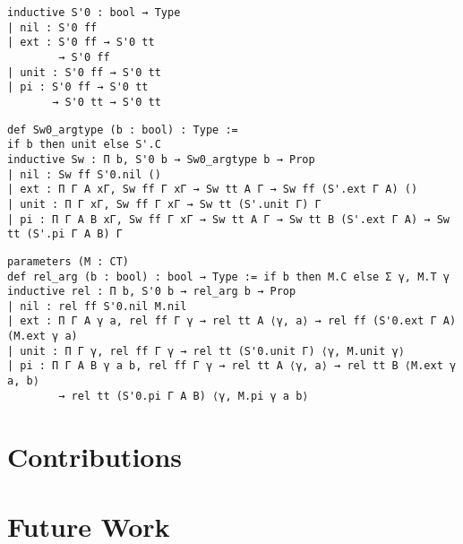 \documentclass{easychair}
\begin{document}
\noindent
\begin{minipage}{.3\textwidth}
\begin{lstlisting}
inductive S'0 : bool → Type
| nil : S'0 ff
| ext : S'0 ff → S'0 tt
        → S'0 ff
| unit : S'0 ff → S'0 tt
| pi : S'0 ff → S'0 tt
       → S'0 tt → S'0 tt
\end{lstlisting}
\end{minipage} \hfill
\begin{minipage}{.68\textwidth}
\begin{lstlisting}
def Sw0_argtype (b : bool) : Type :=
if b then unit else S'.C
inductive Sw : Π b, S'0 b → Sw0_argtype b → Prop
| nil : Sw ff S'0.nil ()
| ext : Π Γ A xΓ, Sw ff Γ xΓ → Sw tt A Γ → Sw ff (S'.ext Γ A) ()
| unit : Π Γ xΓ, Sw ff Γ xΓ → Sw tt (S'.unit Γ) Γ
| pi : Π Γ A B xΓ, Sw ff Γ xΓ → Sw tt A Γ → Sw tt B (S'.ext Γ A) → Sw tt (S'.pi Γ A B) Γ
\end{lstlisting}
\end{minipage}
\noindent\begin{minipage}{\textwidth}\begin{lstlisting}
parameters (M : CT)
def rel_arg (b : bool) : bool → Type := if b then M.C else Σ γ, M.T γ
inductive rel : Π b, S'0 b → rel_arg b → Prop
| nil : rel ff S'0.nil M.nil
| ext : Π Γ A γ a, rel ff Γ γ → rel tt A ⟨γ, a⟩ → rel ff (S'0.ext Γ A) (M.ext γ a)
| unit : Π Γ γ, rel ff Γ γ → rel tt (S'0.unit Γ) ⟨γ, M.unit γ⟩
| pi : Π Γ A B γ a b, rel ff Γ γ → rel tt A ⟨γ, a⟩ → rel tt B ⟨M.ext γ a, b⟩
        → rel tt (S'0.pi Γ A B) ⟨γ, M.pi γ a b⟩
\end{lstlisting}
\end{minipage}


\section{Contributions}

\section{Future Work}



\end{document}
